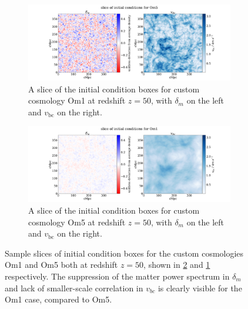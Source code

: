 \documentclass[floats,floatfix,showpacs,amssymb,prd,superscriptaddress,nofootinbib, 11pt]{revtex4-2} %
\begin{document}

\begin{figure}[H]
     \centering
     \begin{subfigure}[b]{0.9\textwidth}
         \centering
         \includegraphics[width=\textwidth]{images/ic_grids/initial_condition_grid_Om5.png}
         \caption{A slice of the initial condition boxes for custom cosmology Om1 at redshift $z = 50$, with $\delta_m$ on the left and $v_{\text{bc}}$ on the right.}
         \label{fig:IC_Om5}
     \end{subfigure}
     \hfill
     \begin{subfigure}[b]{0.9\textwidth}
         \centering
         \includegraphics[width=\textwidth]{images/ic_grids/initial_condition_grid_Om1.png}
         \caption{A slice of the initial condition boxes for custom cosmology Om5 at redshift $z = 50$, with $\delta_m$ on the left and $v_{\text{bc}}$ on the right.}
         \label{fig:IC_Om1}
     \end{subfigure}
        \caption{Sample slices of initial condition boxes for the custom cosmologies Om1 and Om5 both at redshift $z = 50$, shown in \ref{fig:IC_Om1} and \ref{fig:IC_Om5} respectively. The suppression of the matter power spectrum in $\delta_m$ and lack of smaller-scale correlation in $v_{bc}$ is clearly visible for the Om1 case, compared to Om5.}
        \label{fig:IC_custom}
\end{figure}
\end{document}

